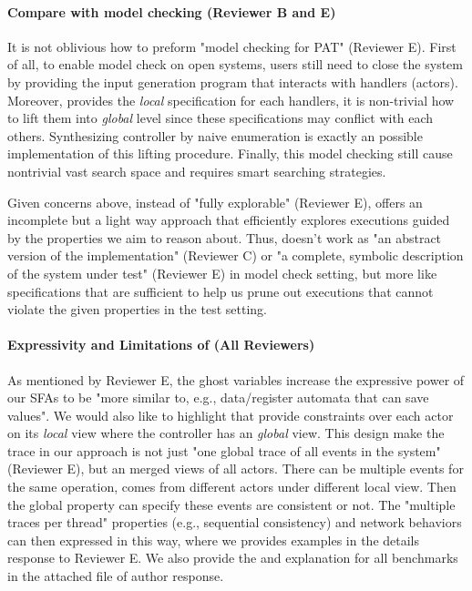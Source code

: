 \paragraph{Compare with model checking (Reviewer B and E)} It is
not oblivious how to preform "model checking for PAT" (Reviewer
E). First of all, to enable model check on open systems, users still
need to close the system by providing the input generation program
that interacts with handlers (actors). Moreover, \PAT provides the
\emph{local} specification for each handlers, it is non-trivial how to
lift them into \emph{global} level since these specifications may
conflict with each others. Synthesizing controller by naive
enumeration is exactly an possible implementation of this lifting
procedure. Finally, this model checking still cause nontrivial vast
search space and requires smart searching strategies.

Given concerns above, instead of "fully explorable" (Reviewer E), \PAT
offers an incomplete but a light way approach that efficiently
explores executions guided by the properties we aim to reason
about. Thus, \PAT doesn't work as "an abstract version of the
implementation" (Reviewer C) or "a complete, symbolic description of
the system under test" (Reviewer E) in model check setting, but more
like specifications that are sufficient to help us prune out
executions that cannot violate the given properties in the test
setting.

\paragraph{Expressivity and Limitations of \PAT (All Reviewers)} As mentioned by
Reviewer E, the ghost variables increase the expressive power of our
SFAs to be "more similar to, e.g., data/register automata that can
save values". We would also like to highlight that \PAT provide
constraints over each actor on its \emph{local} view where the
controller has an \emph{global} view. This design make the trace in
our approach is not just "one global trace of all events in the
system" (Reviewer E), but an merged views of all actors. There can be
multiple events for the same operation, comes from different actors
under different local view. Then the global property can specify these
events are consistent or not. The "multiple traces per thread"
properties (e.g., sequential consistency) and network behaviors can
then expressed in this way, where we provides examples in the details
response to Reviewer E. We also provide the \PAT and explanation for
all benchmarks in the attached file of author response.


